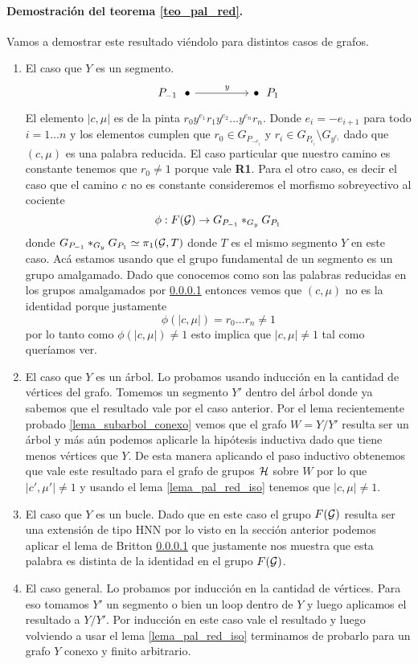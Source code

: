 \documentclass[tesis.tex]{subfiles}
\begin{document}
\paragraph{Demostración del teorema \ref{teo_pal_red}.}
Vamos a demostrar este resultado viéndolo para distintos casos de grafos.
	\begin{enumerate}
		\item El caso que $Y$ es un segmento.
		\[\begin{tikzcd}
			{P_{-1} \ \ \bullet} && {\bullet \ \ P_1}
			\arrow["y"{pos=0.6}, from=1-1, to=1-3]
		\end{tikzcd}\]
		El elemento $|c, \mu|$ es de la pinta $r_0y^{e_1}r_1y^{e_2}\dots y^{e_n}r_n$.
		Donde $e_{i} = -e_{i+1}$ para todo $i=1 \dots n$ y los elementos cumplen que $r_0 \in G_{P_{-e_i}}$ y $r_i \in G_{P_{e_i}} \setminus G_{y^{e_i}}$ dado que $(c, \mu)$ es una palabra reducida.
		El caso particular que nuestro camino es constante tenemos que $r_0 \neq 1$ porque vale \textbf{R1}.
		Para el otro caso, es decir el caso que el camino $c$ no es constante consideremos el morfismo sobreyectivo al cociente 
		\[
			\phi: F({\cal G}) \to G_{P_{-1}} \ast_{G_y} G_{P_1}
		\]
		donde $G_{P_{-1}} \ast_{G_y} G_{P_1} \simeq \pi_1({\cal G}, T)$ donde $T$ es el mismo segmento $Y$ en este caso. 
		Acá estamos usando que el grupo fundamental de un segmento es un grupo amalgamado.
		Dado que conocemos como son las palabras reducidas en los grupos amalgamados por \ref{} entonces vemos que $(c, \mu)$ no es la identidad porque justamente 
		\[
			\phi(|c,\mu|) = r_0 \dots r_n \neq 1
		\]
		por lo tanto como $\phi(|c,\mu|) \neq 1 $ esto implica que $|c,\mu| \neq 1$ tal como queríamos ver.
		
		\item El caso que $Y$ es un árbol. 
		Lo probamos usando inducción en la cantidad de vértices del grafo.
		Tomemos un segmento $Y'$ dentro del árbol donde ya sabemos que el resultado vale por el caso anterior.
		Por el lema recientemente probado \ref{lema_subarbol_conexo} vemos que el grafo $W = Y / Y'$ resulta ser un árbol y más aún podemos aplicarle la hipótesis inductiva dado que tiene menos vértices que $Y$. 
		De esta manera aplicando el paso inductivo obtenemos que vale este resultado para el grafo de grupos ${\cal H}$ sobre $W$ por lo que $|c',\mu'| \neq 1$ y usando el lema \ref{lema_pal_red_iso} tenemos que $|c, \mu| \neq 1$.
		
		\item El caso que $Y$ es un bucle.
		Dado que en este caso el grupo $F({\cal G})$ resulta ser una extensión de tipo HNN por lo visto en la sección anterior podemos aplicar el lema de Britton \ref{} que justamente nos muestra que esta palabra es distinta de la identidad en el grupo $F({\cal G})$.
		
		\item El caso general.
		Lo probamos por inducción en la cantidad de vértices. 
		Para eso tomamos $Y'$ un segmento o bien un loop dentro de $Y$ y luego aplicamos el resultado a $Y/Y'$.
		Por inducción en este caso vale el resultado y luego volviendo a usar el lema \ref{lema_pal_red_iso} terminamos de probarlo para un grafo $Y$ conexo y finito arbitrario.
	\end{enumerate}
\end{document}
